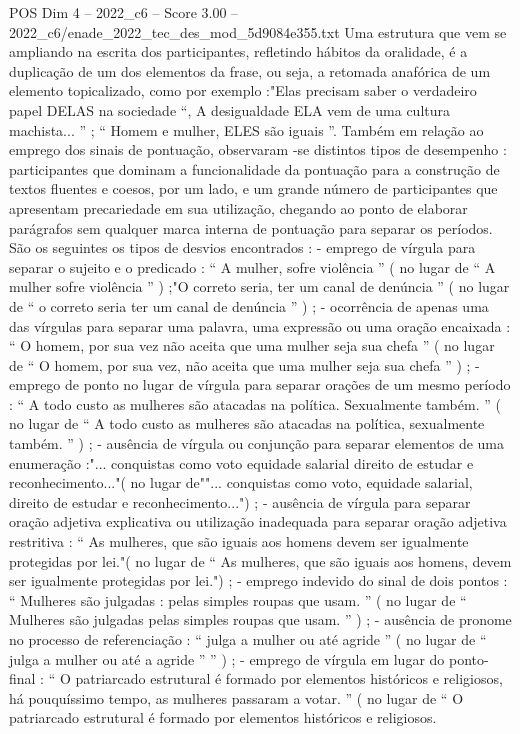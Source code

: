 \begin{textsample}{POS Dim 4 – 2022\_c6 – Score 3.00 – 2022\_c6/enade\_2022\_tec\_des\_mod\_5d9084e355.txt}
Uma estrutura que vem se ampliando na escrita dos participantes, refletindo hábitos da oralidade, é a duplicação de um dos elementos da frase, ou seja, a retomada anafórica de um elemento topicalizado, como por exemplo :"Elas precisam saber o verdadeiro papel DELAS na sociedade “, A desigualdade ELA vem de uma cultura machista... ” ; “ Homem e mulher, ELES são iguais ”.
Também em relação ao emprego dos sinais de pontuação, observaram -se distintos tipos de desempenho : participantes que dominam a funcionalidade da pontuação para a construção de textos fluentes e coesos, por um lado, e um grande número de participantes que apresentam precariedade em sua utilização, chegando ao ponto de elaborar parágrafos sem qualquer marca interna de pontuação para separar os períodos.
São os seguintes os tipos de desvios encontrados : - emprego de vírgula para separar o sujeito e o predicado : “ A mulher, sofre violência ” ( no lugar de “ A mulher sofre violência ” ) ;"O correto seria, ter um canal de denúncia ” ( no lugar de “ o correto seria ter um canal de denúncia ” ) ; - ocorrência de apenas uma das vírgulas para separar uma palavra, uma expressão ou uma oração encaixada : “ O homem, por sua vez não aceita que uma mulher seja sua chefa ” ( no lugar de “ O homem, por sua vez, não aceita que uma mulher seja sua chefa ” ) ; - emprego de ponto no lugar de vírgula para separar orações de um mesmo período : “ A todo custo as mulheres são atacadas na política.
Sexualmente também. ” ( no lugar de “ A todo custo as mulheres são atacadas na política, sexualmente também. ” ) ; - ausência de vírgula ou conjunção para separar elementos de uma enumeração :"... conquistas como voto equidade salarial direito de estudar e reconhecimento..."( no lugar de""... conquistas como voto, equidade salarial, direito de estudar e reconhecimento...") ; - ausência de vírgula para separar oração adjetiva explicativa ou utilização inadequada para separar oração adjetiva restritiva : “ As mulheres, que são iguais aos homens devem ser igualmente protegidas por lei."( no lugar de “ As mulheres, que são iguais aos homens, devem ser igualmente protegidas por lei.") ; - emprego indevido do sinal de dois pontos : “ Mulheres são julgadas : pelas simples roupas que usam. ” ( no lugar de “ Mulheres são julgadas pelas simples roupas que usam. ” ) ; - ausência de pronome no processo de referenciação : “ julga a mulher ou até agride ” ( no lugar de “ julga a mulher ou até a agride ” ” ) ; - emprego de vírgula em lugar do ponto-final : “ O patriarcado estrutural é formado por elementos históricos e religiosos, há pouquíssimo tempo, as mulheres passaram a votar. ” ( no lugar de “ O patriarcado estrutural é formado por elementos históricos e religiosos.

\end{textsample}
